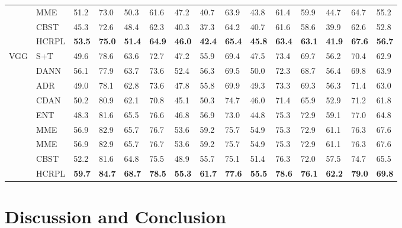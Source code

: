 \documentclass[a4paper,fleqn]{cas-dc}
\begin{document}
\begin{table}
\begin{tabular}{lllllllllllllll}
			~ & MME \cite{saito2019semi} & 51.2 & 73.0 & 50.3 & 61.6 & 47.2 & 40.7 & 63.9 & 43.8 & 61.4 & 59.9 & 44.7 & 64.7 & 55.2 \\
			~ & CBST \cite{zou2018domain} & 45.3 & 72.6 & 48.4 & 62.3 & 40.3 & 37.3 & 64.2 & 40.7 & 61.6 & 58.6 & 39.9 & 62.6 & 52.8 \\
			~ & HCRPL & \textbf{53.5} & \textbf{75.0} & \textbf{51.4} & \textbf{64.9} & \textbf{46.0} & \textbf{42.4} & \textbf{65.4} & \textbf{45.8} & \textbf{63.4} & \textbf{63.1} & \textbf{41.9} & \textbf{67.6} & \textbf{56.7} \\
			\midrule
			\midrule
			\multirow{8}{*}{VGG} & S+T & 49.6 & 78.6 & 63.6 & 72.7 & 47.2 & 55.9 & 69.4 & 47.5 & 73.4 & 69.7 & 56.2 & 70.4 & 62.9 \\
			~ & DANN \cite{ganin2016domain} & 56.1 & 77.9 & 63.7 & 73.6 & 52.4 & 56.3 & 69.5 & 50.0 & 72.3 & 68.7 & 56.4 & 69.8 & 63.9 \\
			~ & ADR \cite{saito2017adversarial} & 49.0 &  78.1 & 62.8 & 73.6 & 47.8 & 55.8 & 69.9 & 49.3 & 73.3 & 69.3 & 56.3 & 71.4 & 63.0 \\
			~ & CDAN \cite{long2018conditional} & 50.2 & 80.9 & 62.1 & 70.8 & 45.1 & 50.3 & 74.7 & 46.0 & 71.4 & 65.9 & 52.9 & 71.2 & 61.8 \\
			~ & ENT \cite{grandvalet2005semi} & 48.3 & 81.6 & 65.5 & 76.6 & 46.8 & 56.9 & 73.0 & 44.8 & 75.3 & 72.9 & 59.1 & 77.0 & 64.8 \\
			~ & MME \cite{saito2019semi} & 56.9 & 82.9 & 65.7 & 76.7 & 53.6 & 59.2 & 75.7 & 54.9 & 75.3 & 72.9 & 61.1 & 76.3 & 67.6 \\
			~ & MME \cite{saito2019semi} & 56.9 & 82.9 & 65.7 & 76.7 & 53.6 & 59.2 & 75.7 & 54.9 & 75.3 & 72.9 & 61.1 & 76.3 & 67.6 \\
			~ & CBST \cite{zou2018domain} & 52.2 & 81.6 & 64.8 & 75.5 & 48.9 & 55.7 & 75.1 & 51.4 & 76.3 & 72.0 & 57.5 & 74.7 & 65.5 \\
			~ & HCRPL & \textbf{59.7} & \textbf{84.7} & \textbf{68.7} & \textbf{78.5} & \textbf{55.3} & \textbf{61.7} & \textbf{77.6} & \textbf{55.5} & \textbf{78.6} & \textbf{76.1} & \textbf{62.2} & \textbf{79.0} & \textbf{69.8} \\
			\bottomrule
		\end{tabular}
		\label{table12}
	\end{table}
	
	
	\section{Discussion and Conclusion}
	
\end{document}

